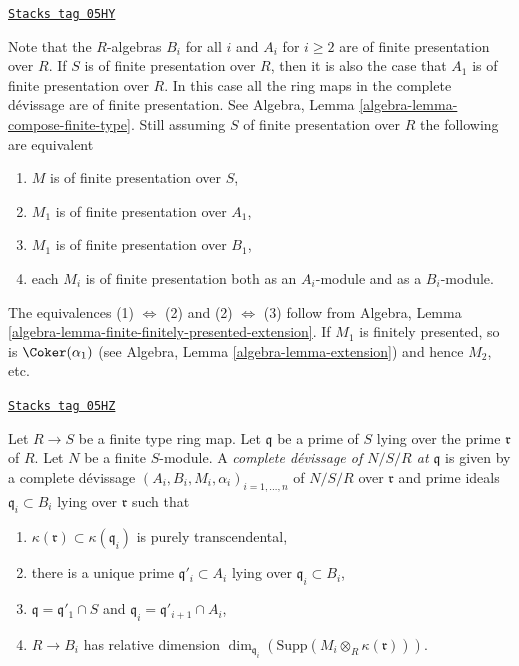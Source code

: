 \begin{remark}
\label{flat-remark-finite-presentation}
\href{https://stacks.math.columbia.edu/tag/05HY}{\texttt{Stacks tag 05HY}}

Note that the $R$-algebras $B_i$ for all $i$ and $A_i$ for $i \geq 2$
are of finite presentation over $R$. If $S$ is of finite presentation over
$R$, then it is also the case that $A_1$ is of finite presentation over
$R$. In this case all the ring maps in the complete d\'evissage are of
finite presentation. See
Algebra, Lemma \ref{algebra-lemma-compose-finite-type}.
Still assuming $S$ of finite presentation over $R$
the following are equivalent
\begin{enumerate}
\item $M$ is of finite presentation over $S$,
\item $M_1$ is of finite presentation over $A_1$,
\item $M_1$ is of finite presentation over $B_1$,
\item each $M_i$ is of finite presentation both as an $A_i$-module
and as a $B_i$-module.
\end{enumerate}
The equivalences (1) $\Leftrightarrow$ (2) and (2) $\Leftrightarrow$ (3)
follow from
Algebra, Lemma \ref{algebra-lemma-finite-finitely-presented-extension}.
If $M_1$ is finitely presented, so is $\Coker(\alpha_1)$ (see
Algebra, Lemma \ref{algebra-lemma-extension})
and hence $M_2$, etc.
\end{remark}

\begin{definition}
\label{flat-definition-complete-devissage-at-x-algebra}
\href{https://stacks.math.columbia.edu/tag/05HZ}{\texttt{Stacks tag 05HZ}}

Let $R \to S$ be a finite type ring map.
Let $\mathfrak q$ be a prime of $S$ lying over the prime $\mathfrak r$ of $R$.
Let $N$ be a finite $S$-module.
A {\it complete d\'evissage of $N/S/R$ at $\mathfrak q$} is given by a
complete d\'evissage $(A_i, B_i, M_i, \alpha_i)_{i = 1, \ldots, n}$
of $N/S/R$ over $\mathfrak r$ and prime ideals $\mathfrak q_i \subset B_i$
lying over $\mathfrak r$ such that
\begin{enumerate}
\item $\kappa(\mathfrak r) \subset \kappa(\mathfrak q_i)$ is purely
transcendental,
\item there is a unique prime $\mathfrak q'_i \subset A_i$
lying over $\mathfrak q_i \subset B_i$,
\item $\mathfrak q = \mathfrak q'_1 \cap S$ and
$\mathfrak q_i = \mathfrak q'_{i + 1} \cap A_i$,
\item $R \to B_i$ has relative dimension
$\dim_{\mathfrak q_i}(\text{Supp}(M_i \otimes_R \kappa(\mathfrak r)))$.
\end{enumerate}
\end{definition}

